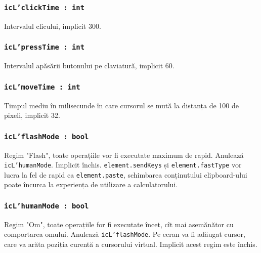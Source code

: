 \subsubsection{\texttt{icL'clickTime : int}}

Intervalul clicului, implicit 300.

\subsubsection{\texttt{icL'pressTime : int}}

Intervalul apăsării butonului pe claviatură, implicit 60.

\subsubsection{\texttt{icL'moveTime : int}}

Timpul mediu în milisecunde în care cursorul se mută la distanța de 100 de pixeli, implicit 32.

\subsubsection{\texttt{icL'flashMode : bool}}

Regim "Flash", toate operațiile vor fi executate maximum de rapid. Anulează \texttt{icL'humanMode}. Implicit închis. \texttt{element.sendKeys} și \texttt{element.fastType} vor lucra la fel de rapid ca \texttt{element.paste}, schimbarea conținutului clipboard-ului poate încurca la experiența de utilizare a calculatorului.

\subsubsection{\texttt{icL'humanMode : bool}}

Regim "Om", toate operațiile for fi executate încet, cît mai asemănător cu comportarea omului. Anulează \texttt{icL'flashMode}. Pe ecran va fi adăugat cursor, care va arăta poziția curentă a cursorului virtual. Implicit acest regim este închis.


